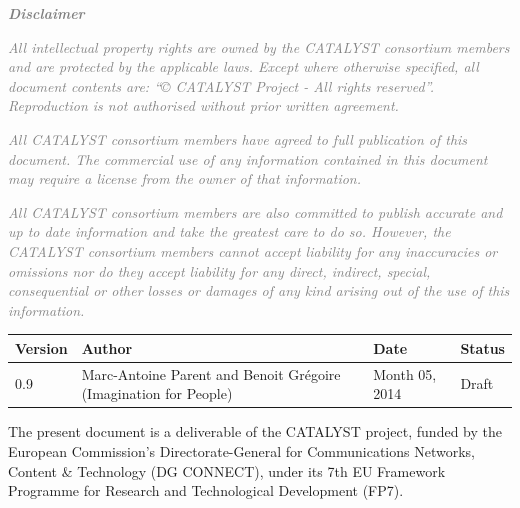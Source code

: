 \textcolor{gray}{{\bfseries \emph{Disclaimer}}}

\textcolor{gray}{\textit{
All intellectual property rights are owned by the CATALYST consortium members and are protected by the applicable laws. Except where otherwise specified, all document contents are: “© CATALYST Project - All rights reserved”. Reproduction is not authorised without prior written agreement.}}

\textcolor{gray}{\textit{
All CATALYST consortium members have agreed to full publication of this document. The commercial use of any information contained in this document may require a license from the owner of that information. }}

\textcolor{gray}{\textit{
All CATALYST consortium members are also committed to publish accurate and up to date information and take the greatest care to do so. However, the CATALYST consortium members cannot accept liability for any inaccuracies or omissions nor do they accept liability for any direct, indirect, special, consequential or other losses or damages of any kind arising out of the use of this information.}}
\normalsize

\clearpage
{}

\begin{tabular}{|l|l|l|l|}
\hline
\rowcolor{h1b}
\bfseries Version & \bfseries Author & \bfseries Date & \bfseries Status \\
\hline
0.9&Marc-Antoine Parent and Benoit Grégoire (Imagination for People)&Month 05, 2014&Draft\\
\hline
\end{tabular}
\clearpage
\pagestyle{catalystp}
\tableofcontents

\clearpage


\small
The present document is a deliverable of the CATALYST project, funded by the European Commission’s Directorate-General for Communications Networks, Content \& Technology (DG CONNECT), under its 7th EU Framework Programme for Research and Technological Development (FP7).

\clearpage

